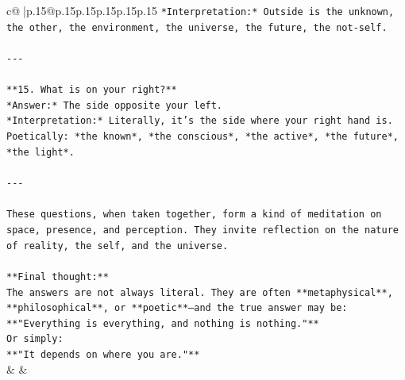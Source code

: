 \documentclass{article}
\begin{document}
{\begin{supertabular}{c@{$\;$}|p{.15\linewidth}@{}p{.15\linewidth}p{.15\linewidth}p{.15\linewidth}p{.15\linewidth}p{.15\linewidth}}
{{{\texttt{*Interpretation:* Outside is the unknown, the other, the environment, the universe, the future, the not{-}self.} \\
\\ 
\texttt{{-}{-}{-}} \\
\\ 
\texttt{**15. What is on your right?**  } \\
\texttt{*Answer:* The side opposite your left.  } \\
\texttt{*Interpretation:* Literally, it’s the side where your right hand is. Poetically: *the known*, *the conscious*, *the active*, *the future*, *the light*.} \\
\\ 
\texttt{{-}{-}{-}} \\
\\ 
\texttt{These questions, when taken together, form a kind of meditation on space, presence, and perception. They invite reflection on the nature of reality, the self, and the universe.} \\
\\ 
\texttt{**Final thought:**  } \\
\texttt{The answers are not always literal. They are often **metaphysical**, **philosophical**, or **poetic**—and the true answer may be:  } \\
\texttt{**"Everything is everything, and nothing is nothing."**  } \\
\texttt{Or simply:  } \\
\texttt{**"It depends on where you are."**} \\
            }
        }
    }
    & & \\ \\


\end{supertabular}}
\end{document}

